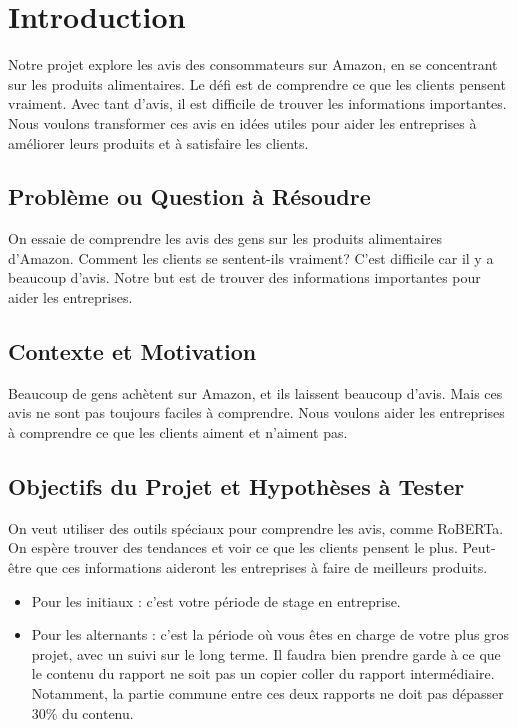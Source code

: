 \documentclass{rapportCS}
\begin{document}

\tabledematieres %




\section{Introduction} 

Notre projet explore les avis des consommateurs sur Amazon, en se concentrant sur les produits alimentaires. Le défi est de comprendre ce que les clients pensent vraiment. Avec tant d'avis, il est difficile de trouver les informations importantes. Nous voulons transformer ces avis en idées utiles pour aider les entreprises à améliorer leurs produits et à satisfaire les clients.


\subsection{Problème ou Question à Résoudre}
On essaie de comprendre les avis des gens sur les produits alimentaires d'Amazon. Comment les clients se sentent-ils vraiment? C'est difficile car il y a beaucoup d'avis. Notre but est de trouver des informations importantes pour aider les entreprises.

\subsection{Contexte et Motivation}
Beaucoup de gens achètent sur Amazon, et ils laissent beaucoup d'avis. Mais ces avis ne sont pas toujours faciles à comprendre. Nous voulons aider les entreprises à comprendre ce que les clients aiment et n'aiment pas.

\subsection{Objectifs du Projet et Hypothèses à Tester}
On veut utiliser des outils spéciaux pour comprendre les avis, comme RoBERTa. On espère trouver des tendances et voir ce que les clients pensent le plus. Peut-être que ces informations aideront les entreprises à faire de meilleurs produits.







\begin{itemize}
    \item Pour les initiaux : c'est votre période de stage en entreprise.
    \item Pour les alternants : c'est la période où vous êtes en charge de votre plus gros projet, avec un suivi sur le long terme. Il faudra bien prendre garde à ce que le contenu du rapport ne soit pas un copier coller du rapport intermédiaire. Notamment, la partie commune entre ces deux rapports ne doit pas dépasser 30\% du contenu.
\end{itemize}
\end{document}
